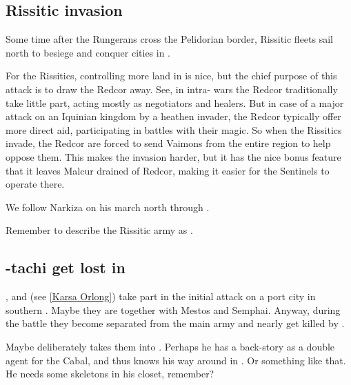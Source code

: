 \begin{garbage}
\subsection{Rissitic invasion}
Some time after the Rungerans cross the Pelidorian border, Rissitic fleets sail north to besiege and conquer cities in \Scyrum. 


For the Rissitics, controlling more land in \Velcad{} is nice, but the chief purpose of this attack is to draw the Redcor away. See, in intra-\Velcadian{} wars the Redcor traditionally take little part, acting mostly as negotiators and healers. But in case of a major attack on an Iquinian kingdom by a heathen invader, the Redcor typically offer more direct aid, participating in battles with their magic. So when the Rissitics invade, the Redcor are forced to send Vaimons from the entire region to help oppose them. 
This makes the invasion harder, but it has the nice bonus feature that it leaves Malcur drained of Redcor, making it easier for the Sentinels to operate there. 

We follow Narkiza on his march north through \Scyrum. 



Remember to describe the Rissitic army as .







\subsection{\Shilred-tachi get lost in \Nyx}
\Shilred{}, \Dzasselid{} and \KarsaOrlong{} (see \ref{Karsa Orlong}) take part in the initial attack on a port city in southern \Scyrum. Maybe they are together with Mestos and Semphai. Anyway, during the battle they become separated from the main army and nearly get killed by \banes. %

Maybe \Dzasselid{} deliberately takes them into \Nyx. Perhaps he has a back-story as a double agent for the Cabal, and thus knows his way around in \Nyx. Or something like that. He needs some skeletons in his closet, remember?


\end{garbage}
